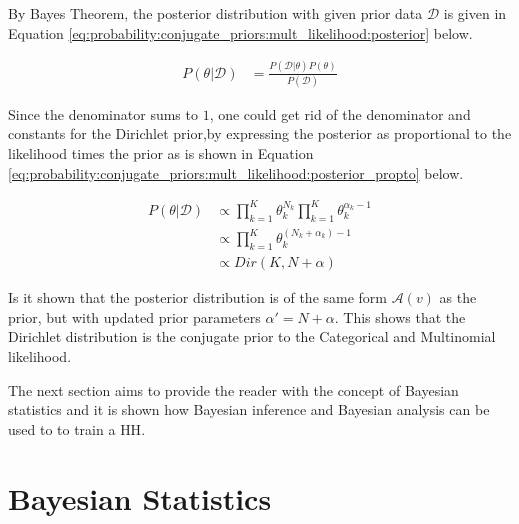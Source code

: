 By Bayes Theorem, the posterior distribution with given prior data $\mathcal{D}$ is given in Equation \ref{eq:probability:conjugate_priors:mult_likelihood:posterior} below.
	
\begin{equation}
    \label{eq:probability:conjugate_priors:mult_likelihood:posterior}
    \begin{split}
    	P(\theta \vert \mathcal{D}) &= \frac{P(\mathcal{D} \vert \theta) P(\theta)}{P(\mathcal{D})}
    \end{split}
\end{equation}

Since the denominator sums to $1$, one could get rid of the denominator and constants for the Dirichlet prior,by expressing the posterior as proportional to the likelihood times the prior as is shown in Equation \ref{eq:probability:conjugate_priors:mult_likelihood:posterior_propto} below.

\begin{equation}
    \label{eq:probability:conjugate_priors:mult_likelihood:posterior_propto}
    \begin{split}
    	P(\theta \vert \mathcal{D}) &\propto \prod_{k=1}^{K} \theta_{k}^{N_{k}} \prod_{k=1}^{K} \theta_{k}^{\alpha_{k} - 1}\\
    	&\propto \prod_{k=1}^{K} \theta_{k}^{(N_{k} + \alpha_{k}) - 1} \\
    	&\propto Dir(K, N + \alpha) 
    \end{split}
\end{equation}

Is it shown that the posterior distribution is of the same form $\mathcal{A}(v)$ as the prior, but with updated prior parameters $\alpha' = N + \alpha$. This shows that the Dirichlet distribution is the conjugate prior to the Categorical and Multinomial likelihood.

The next section aims to provide the reader with the concept of Bayesian statistics and it is shown how Bayesian inference and Bayesian analysis can be used to to train a \ac{HH}.


\section{Bayesian Statistics}
\label{sec:probability:bayesian_statistics}

